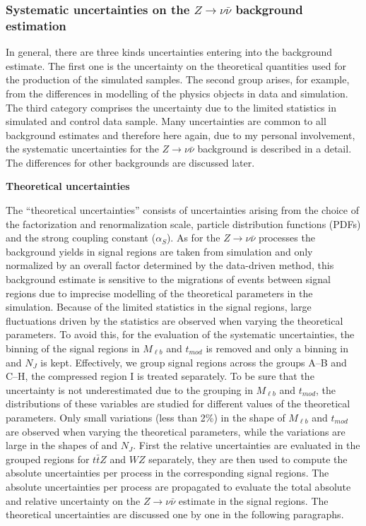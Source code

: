 \subsubsection{Systematic uncertainties on the $Z \to \nu \bar{\nu}$ background estimation}


In general, there are three kinds uncertainties entering into the background estimate. The first one is the uncertainty on the theoretical quantities used for the production of the simulated samples. The second group arises, for example, from the differences in modelling of the physics objects in data and simulation. The third category comprises the uncertainty due to the limited statistics in simulated and control data sample. Many uncertainties are common to all background estimates and therefore here again, due to my personal involvement, the systematic uncertainties for the $Z \to \nu \bar{\nu}$ background is described in a detail. The differences for other backgrounds are discussed later.

\textbf{Theoretical uncertainties}

The  ``theoretical uncertainties'' consists of uncertainties arising from the choice of the factorization and renormalization scale, particle distribution functions (PDFs) and the strong coupling constant ($\alpha_{S}$). As for the $Z \to \nu  \bar{\nu}$ processes the background yields in signal regions are taken from simulation and only normalized by an overall factor determined by the data-driven method, this background estimate is sensitive to the migrations of events between signal regions due to imprecise modelling of the theoretical parameters in the simulation. Because of the limited statistics in the signal regions, large fluctuations driven by the statistics are observed when varying the theoretical parameters. To avoid this, for the evaluation of the systematic uncertainties, the binning of the signal regions in $M_{\ell b}$ and $t_{mod}$ is removed and only a binning in \MET and $N_{J}$ is kept. Effectively, we group signal regions across the groups A--B and C--H, the compressed region I is treated separately. To be sure that the uncertainty is not underestimated due to the grouping in $M_{\ell b}$ and $t_{mod}$, the distributions of these variables are studied for different values of the theoretical parameters. Only small variations (less than 2\%) in the shape of $M_{\ell b}$ and $t_{mod}$ are observed when varying the theoretical parameters, while the variations are large in the shapes of \MET and $N_{J}$.  First the relative uncertainties are evaluated in the grouped regions for $t\bar{t}Z$ and $WZ$ separately, they are then used to compute the absolute uncertainties per process in the corresponding signal regions. The absolute uncertainties per process are propagated to evaluate the total absolute and relative uncertainty on the $Z \to \nu \bar{\nu}$ estimate in the signal regions.  The theoretical uncertainties are discussed one by one in the following paragraphs.



